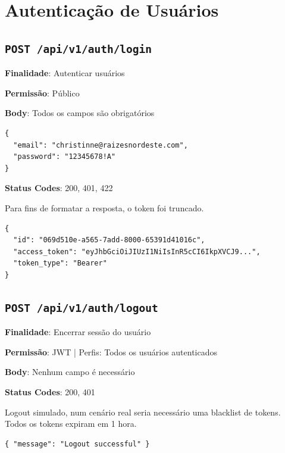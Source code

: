 \section{Autenticação de Usuários}

\subsection{\texttt{POST /api/v1/auth/login}}

\noindent\textbf{Finalidade}: Autenticar usuários

\noindent\textbf{Permissão}: Público

\noindent\textbf{Body}: Todos os campos são obrigatórios

\vspace{-0.2cm}

\begin{verbatim}
{
  "email": "christinne@raizesnordeste.com",
  "password": "12345678!A"
}
\end{verbatim}

\noindent\textbf{Status Codes}: 200, 401, 422

\begin{tcolorbox}[colback=green!5, colframe=black, title=\textbf{200 OK}]
Para fins de formatar a resposta, o token foi truncado.
\begin{verbatim}
{
  "id": "069d510e-a565-7add-8000-65391d41016c",
  "access_token": "eyJhbGciOiJIUzI1NiIsInR5cCI6IkpXVCJ9...",
  "token_type": "Bearer"
}
\end{verbatim}
\end{tcolorbox}

\subsection{\texttt{POST /api/v1/auth/logout}}

\noindent\textbf{Finalidade}: Encerrar sessão do usuário

\noindent\textbf{Permissão}: JWT | Perfis: Todos os usuários autenticados

\noindent\textbf{Body}: Nenhum campo é necessário

\noindent\textbf{Status Codes}: 200, 401

\begin{tcolorbox}[colback=green!10, colframe=black, title=\textbf{200 OK}]
Logout simulado, num cenário real seria necessário uma blacklist de tokens. \\
Todos os tokens expiram em 1 hora.

\begin{verbatim}
{ "message": "Logout successful" }
\end{verbatim}
\end{tcolorbox}
